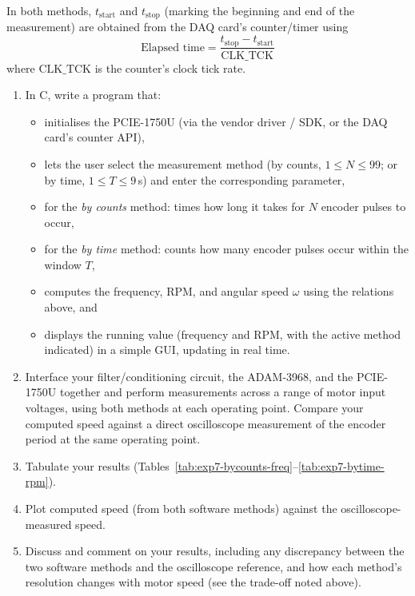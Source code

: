 \begin{procedure}
  In both methods, $t_{\text{start}}$ and $t_{\text{stop}}$ (marking the beginning and end of the measurement) are obtained from the DAQ card's counter/timer using
  \[
    \text{Elapsed time} = \frac{t_{\text{stop}} - t_{\text{start}}}{\text{CLK\_TCK}}
  \]
  where $\text{CLK\_TCK}$ is the counter's clock tick rate.

  \begin{enumerate}
    \item In C, write a program that:
          \begin{itemize}
            \item initialises the PCIE-1750U (via the vendor driver / SDK, or the DAQ card's counter API),
            \item lets the user select the measurement method (by counts, $1 \leq N \leq 99$; or by time, $1 \leq T \leq 9$\,s) and enter the corresponding parameter,
            \item for the \emph{by counts} method: times how long it takes for $N$ encoder pulses to occur,
            \item for the \emph{by time} method: counts how many encoder pulses occur within the window $T$,
            \item computes the frequency, RPM, and angular speed $\omega$ using the relations above, and
            \item displays the running value (frequency and RPM, with the active method indicated) in a simple GUI, updating in real time.
          \end{itemize}
    \item Interface your filter/conditioning circuit, the ADAM-3968, and the PCIE-1750U together and perform measurements across a range of motor input voltages, using both methods at each operating point. Compare your computed speed against a direct oscilloscope measurement of the encoder period at the same operating point.
    \item Tabulate your results (Tables~\ref{tab:exp7-bycounts-freq}--\ref{tab:exp7-bytime-rpm}).
    \item Plot computed speed (from both software methods) against the oscilloscope-measured speed.
    \item Discuss and comment on your results, including any discrepancy between the two software methods and the oscilloscope reference, and how each method's resolution changes with motor speed (see the trade-off noted above).
  \end{enumerate}


\end{procedure}
